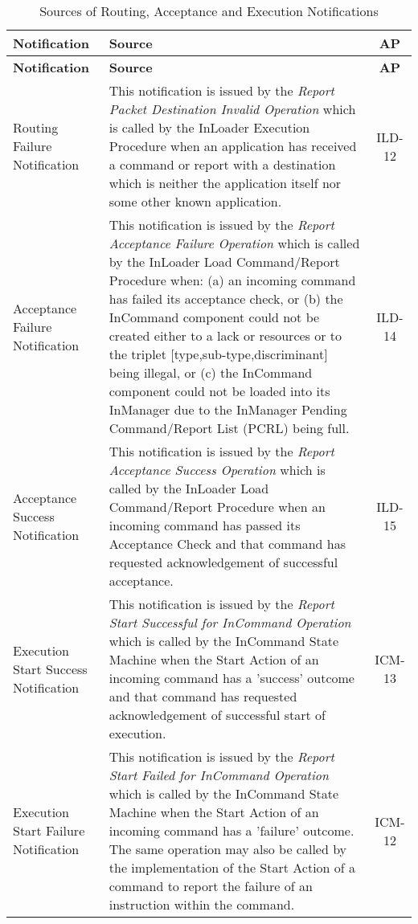\documentclass{pnp_article}
\begin{document}
\begin{longtable}{|>{\raggedright\arraybackslash}p{2.1cm}|>{\raggedright\arraybackslash}p{9.8cm}|c|}
\caption{Sources of Routing, Acceptance and Execution Notifications}\label{tab:sourcesNotif} \\
\hline
\rowcolor{light-gray}
\textbf{Notification} & \textbf{Source} & \textbf{AP} \\
\hline\hline
\endfirsthead
\rowcolor{light-gray}
\textbf{Notification} & \textbf{Source} & \textbf{AP} \\
\hline\hline
\endhead
Routing Failure Notification & This notification is issued by the \textit{Report Packet Destination Invalid Operation} which is called by the InLoader Execution Procedure when an application has received a command or report with a destination which is neither the application itself nor some other known application. & ILD-12 \\
\hline
Acceptance Failure Notification & This notification is issued by the \textit{Report Acceptance Failure Operation} which is called by the InLoader Load Command/Report Procedure when: (a) an incoming command has failed its acceptance check, or (b) the InCommand component could not be created either to a lack or resources or to the triplet [type,sub-type,discriminant] being illegal, or (c) the InCommand component could not be loaded into its InManager due to the InManager Pending Command/Report List (PCRL) being full. & ILD-14 \\
\hline
Acceptance Success Notification & This notification is issued by the \textit{Report Acceptance Success Operation} which is called by the InLoader Load Command/Report Procedure when an incoming command has passed its Acceptance Check and that command has requested acknowledgement of successful acceptance. & ILD-15 \\
\hline
Execution Start Success Notification &  This notification is issued by the \textit{Report Start Successful for InCommand Operation} which is called by the InCommand State Machine when the Start Action of an incoming command has a 'success' outcome and that command has requested acknowledgement of successful start of execution. & ICM-13 \\
\hline 
Execution Start Failure Notification &  This notification is issued by the \textit{Report Start Failed for InCommand Operation} which is called by the InCommand State Machine when the Start Action of an incoming command has a 'failure' outcome. The same operation may also be called by the implementation of the Start Action of a command to report the failure of an instruction within the command. & ICM-12 \\

\end{longtable}
\end{document}
